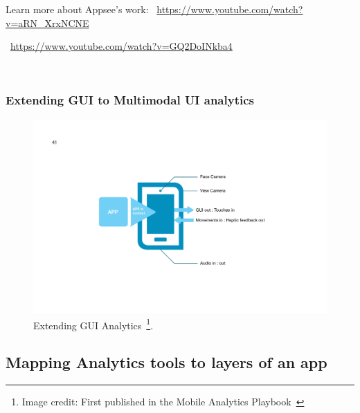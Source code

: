 Learn more about Appsee's work: ~\url{https://www.youtube.com/watch?v=aRN_XrxNCNE}

~\url{https://www.youtube.com/watch?v=GQ2DoINkba4}

~\subsubsection{Extending GUI to Multimodal UI analytics}

\begin{figure}
    \begin{minipage}{\textwidth}
    \centering
    \includegraphics[width=15cm]{images/mobile-analytics-playbook/Chart-11-extending-gui-analytics.png}
    \caption[Extending GUI Analytics]{Extending GUI Analytics~\footnote{Image credit: First published in the Mobile Analytics Playbook~\cite{harty_aymer_playbook_2016}}.}
    \label{fig:extending-gui-analytics}
    \end{minipage}
\end{figure}

\subsection{Mapping Analytics tools to layers of an app}


